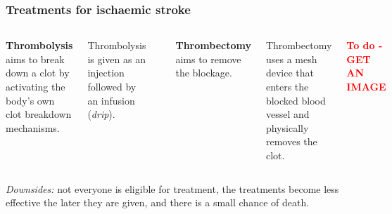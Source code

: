 \documentclass[xcolor={usenames,dvipsnames}]{beamer}
\begin{document}

\begin{frame}
\frametitle{Treatments for ischaemic stroke}

\begin{columns}
    \footnotesize{\textbf{Thrombolysis} aims to break down a clot by activating the body's own clot breakdown mechanisms.}
    
    \vspace{5mm}
    
    \footnotesize{Thrombolysis is given as an injection followed by an infusion (\emph{drip}).}
    
    \begin{center}
    \includegraphics[width=0.6\textwidth]{./images_pink/thrombolysis_mechanism}
    \end{center}
    
    \footnotesize{\textbf{Thrombectomy} aims to remove the blockage.}
    
    \vspace{5mm}
    
    \footnotesize{Thrombectomy uses a mesh device that enters the blocked blood vessel and physically removes the clot.}
    
    \textbf{\textcolor{red}{To do - GET AN IMAGE}}
    
    \begin{center}
    \includegraphics[width=0.6\textwidth]{./images_pink/thrombolysis_mechanism}
    \end{center}

\end{columns}

\vspace{2em}
\emph{Downsides:} not everyone is eligible for treatment, the treatments become less effective the later they are given, and there is a small chance of death. 

\end{frame}
\end{document}
